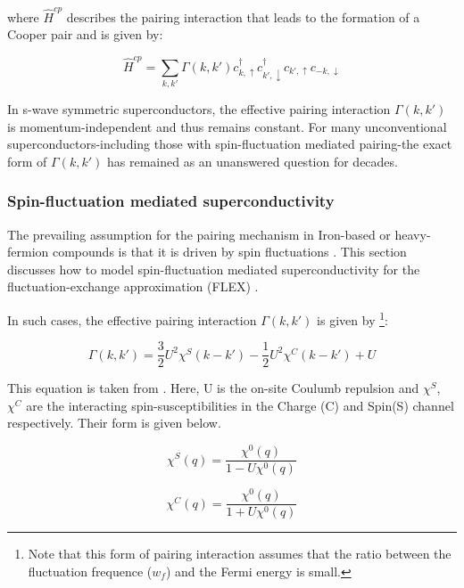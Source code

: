 \documentclass[12pt]{article}
\begin{document}
\noindent where $\hat{H}^{cp}$ describes the pairing interaction that leads to the formation of a Cooper pair and is given by:

\begin{equation}\label{Hcp}
    \hat{H}^{cp} = \sum_{k,k'} \Gamma(k, k') c^{\dagger}_{k, \uparrow}  c^{\dagger}_{k', \downarrow} c_{k', \uparrow}c_{-k, \downarrow}
\end{equation}

\noindent In s-wave symmetric superconductors, the effective pairing interaction $\Gamma(k,k')$ is momentum-independent and thus remains constant. 
For many unconventional superconductors-including those with spin-fluctuation mediated pairing-the exact form of $\Gamma(k,k')$ has remained as an unanswered question for decades. 
\subsubsection{Spin-fluctuation mediated superconductivity}
\label{subsec:spinfluct}

The prevailing assumption for the pairing mechanism in Iron-based or heavy-fermion compounds 
is that it is driven by spin fluctuations \cite{moriya2000spin}. This section discusses how to
model spin-fluctuation mediated superconductivity for the fluctuation-exchange approximation (FLEX) \cite{esirgen1997fluctuation}. \par
\medskip
\noindent In such cases, the effective pairing interaction $\Gamma(k,k')$ is given by \footnote{Note that this form of pairing interaction 
assumes that the ratio between 
the fluctuation frequence ($w_f$) and the Fermi energy is small.}:

\begin{equation}\label{Pairing interaction SF}
    \Gamma(k,k') = \frac{3}{2} U^2 \chi^S(k-k') -\frac{1}{2}U^2 \chi^C(k-k') + U
\end{equation} 

\noindent This equation is taken from \cite{migdal1958interaction}. Here, U is the on-site Coulumb repulsion and $\chi^S$, $\chi^C$ are the interacting spin-susceptibilities in the Charge (C) and Spin(S) channel respectively. Their form is given below.

\begin{equation}
    \chi^S(q) = \frac{\chi^0(q)}{1 - U \chi^0 (q)}
\end{equation}

\begin{equation}
    \chi^C(q) = \frac{\chi^0(q)}{1 + U \chi^0 (q)}
\end{equation}
\end{document}
